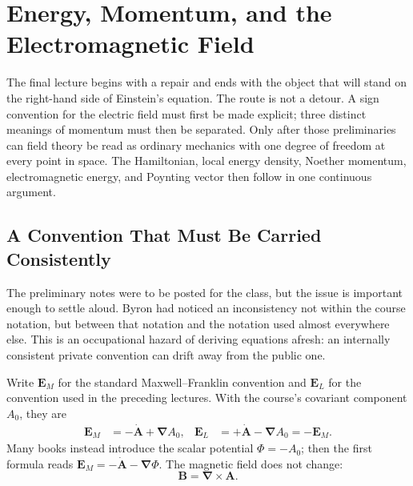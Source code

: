 \chapter{Energy, Momentum, and the Electromagnetic Field}

The final lecture begins with a repair and ends with the object that will
stand on the right-hand side of Einstein's equation. The route is not a
detour. A sign convention for the electric field must first be made
explicit; three distinct meanings of momentum must then be separated.
Only after those preliminaries can field theory be read as ordinary
mechanics with one degree of freedom at every point in space. The
Hamiltonian, local energy density, Noether momentum, electromagnetic
energy, and Poynting vector then follow in one continuous argument.

\section{A Convention That Must Be Carried Consistently}

The preliminary notes were to be posted for the class, but the issue is
important enough to settle aloud. Byron had noticed an inconsistency not
within the course notation, but between that notation and the notation
used almost everywhere else. This is an occupational hazard of deriving
equations afresh: an internally consistent private convention can drift
away from the public one.

Write \(\mathbf E_M\) for the standard Maxwell--Franklin convention and
\(\mathbf E_L\) for the convention used in the preceding lectures. With
the course's covariant component \(A_0\), they are
\begin{align}
\mathbf E_M
  &= -\dot{\mathbf A}+\boldsymbol{\nabla}A_0,
&
\mathbf E_L
  &= +\dot{\mathbf A}-\boldsymbol{\nabla}A_0
   =-\mathbf E_M .
\label{eq:two-electric-conventions}
\end{align}
Many books instead introduce the scalar potential
\(\Phi=-A_0\); then the first formula reads
\(\mathbf E_M=-\dot{\mathbf A}-\boldsymbol{\nabla}\Phi\).
The magnetic field does not change:
\begin{equation}
\mathbf B=\boldsymbol{\nabla}\times\mathbf A.
\label{eq:B-from-A-opening}
\end{equation}

